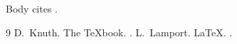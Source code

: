 \documentclass[9pt,twocolumn,twoside]{pnas-new}
\begin{document}
Body cites \cite{knuth,lamport}.
\begin{thebibliography}{9}
 D.~Knuth. \newblock The TeXbook. .
 L.~Lamport. \newblock LaTeX. .
\end{thebibliography}
\end{document}
